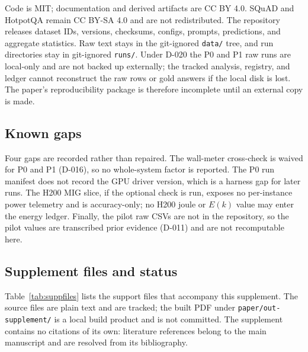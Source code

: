 \documentclass[a4paper,fleqn]{cas-sc}
\begin{document}
Code is MIT; documentation and derived artifacts are CC BY 4.0. SQuAD and HotpotQA remain
CC BY-SA 4.0 and are not redistributed. The repository releases dataset IDs, versions,
checksums, configs, prompts, predictions, and aggregate statistics. Raw text stays in the
git-ignored \texttt{data/} tree, and run directories stay in git-ignored \texttt{runs/}. Under
D-020 the P0 and P1 raw runs are local-only and are not backed up externally; the tracked
analysis, registry, and ledger cannot reconstruct the raw rows or gold answers if the local disk
is lost. The paper's reproducibility package is therefore incomplete until an external copy is
made.

\subsection{Known gaps}

Four gaps are recorded rather than repaired. The wall-meter cross-check is waived for P0 and P1
(D-016), so no whole-system factor is reported. The P0 run manifest does not record the GPU
driver version, which is a harness gap for later runs. The H200 MIG slice, if the optional check
is run, exposes no per-instance power telemetry and is accuracy-only; no H200 joule or $E(k)$
value may enter the energy ledger. Finally, the pilot raw CSVs are not in the repository, so the
pilot values are transcribed prior evidence (D-011) and are not recomputable here.

\subsection{Supplement files and status}

Table~\ref{tab:suppfiles} lists the support files that accompany this supplement. The source
files are plain text and are tracked; the built PDF under \texttt{paper/out-supplement/} is a
local build product and is not committed. The supplement contains no citations of its own:
literature references belong to the main manuscript and are resolved from its bibliography.
\end{document}
